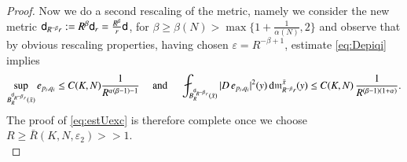 \documentclass[11pt,reqno]{amsart}
\newcommand{\mm}{\mathfrak m}
\newcommand{\sfd}{{\sf d}}
\renewcommand{\d}{{\rm{d}}}
\newcommand{\vare}{\varepsilon}
\theoremstyle{definition}
\theoremstyle{remark}
\theoremstyle{remark}
\theoremstyle{remark}
\theoremstyle{remark}
\theoremstyle{remark}
\theoremstyle{remark}
\theoremstyle{remark}
\begin{document}
\begin{proof}
 

Now we do a second rescaling of the metric, namely we consider the new metric $\sfd_{R^{-\beta} r}:=R^\beta \sfd_r=\frac{R^\beta}{r} \sfd$, for $\beta\geq \beta(N)>\max\{ 1+\frac{1}{\alpha(N)}, 2\}$ and observe that by obvious rescaling properties, having chosen $\vare=R^{-\beta+1}$, estimate \eqref{eq:Depiqi} implies
 \begin{equation}\label{eq:DepiqiR}
 \sup_{B^{\sfd_{R^{-\beta} r}}_{R}(\bar{x})} e_{p_i,q_i} \leq C(K,N)\frac{1}{R^{\alpha(\beta-1)-1}} \quad \text{ and } \quad   \fint_{B^{\sfd_{R^{-\beta} r}}_{R}(\bar{x})} |D \, e_{p_i,q_i}|^2 (y) \, \d \mm^{\bar x}_{R^{-\beta}r}(y) \leq C(K,N)\, \frac{1}{R^{(\beta-1)(1+\alpha)}}.
  \end{equation} 
The proof of \eqref{eq:estUexc} is therefore complete once we choose $R\geq \bar{R}(K,N,\vare_2)>>1$.
\\


\end{proof}
\end{document}
